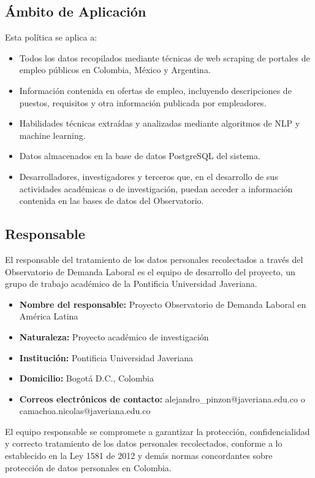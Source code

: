 \documentclass[11pt,oneside,letterpaper]{article}
\begin{document}
\subsection{Ámbito de Aplicación}

Esta política se aplica a:

\begin{itemize}
    \item Todos los datos recopilados mediante técnicas de web scraping de portales de empleo públicos en Colombia, México y Argentina.
    \item Información contenida en ofertas de empleo, incluyendo descripciones de puestos, requisitos y otra información publicada por empleadores.
    \item Habilidades técnicas extraídas y analizadas mediante algoritmos de NLP y machine learning.
    \item Datos almacenados en la base de datos PostgreSQL del sistema.
    \item Desarrolladores, investigadores y terceros que, en el desarrollo de sus actividades académicas o de investigación, puedan acceder a información contenida en las bases de datos del Observatorio.
\end{itemize}

\subsection{Responsable}

El responsable del tratamiento de los datos personales recolectados a través del Observatorio de Demanda Laboral es el equipo de desarrollo del proyecto, un grupo de trabajo académico de la Pontificia Universidad Javeriana.

\begin{itemize}
    \item \textbf{Nombre del responsable:} Proyecto Observatorio de Demanda Laboral en América Latina
    \item \textbf{Naturaleza:} Proyecto académico de investigación
    \item \textbf{Institución:} Pontificia Universidad Javeriana
    \item \textbf{Domicilio:} Bogotá D.C., Colombia
    \item \textbf{Correos electrónicos de contacto:} alejandro\_pinzon@javeriana.edu.co o camachoa.nicolas@javeriana.edu.co
\end{itemize}

El equipo responsable se compromete a garantizar la protección, confidencialidad y correcto tratamiento de los datos personales recolectados, conforme a lo establecido en la Ley 1581 de 2012 y demás normas concordantes sobre protección de datos personales en Colombia.
\end{document}

